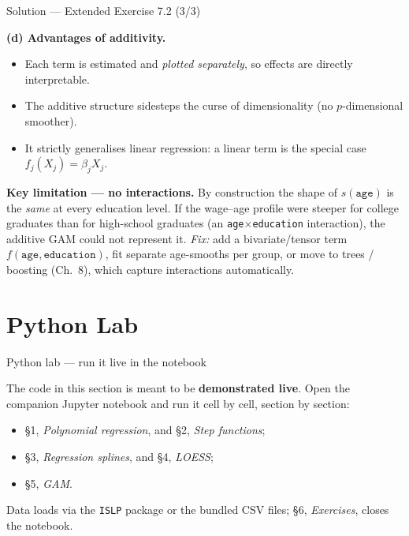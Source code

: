 \documentclass[aspectratio=169,11pt]{beamer}
\begin{document}
\begin{frame}{Solution --- Extended Exercise 7.2 (3/3)}
\begin{solutionbox}
\textbf{(d) Advantages of additivity.}
\begin{itemize}
  \item Each term is estimated and \emph{plotted separately}, so effects are directly interpretable.
  \item The additive structure sidesteps the curse of dimensionality (no $p$-dimensional smoother).
  \item It strictly generalises linear regression: a linear term is the special case $f_j(X_j)=\beta_j X_j$.
\end{itemize}

\textbf{Key limitation --- no interactions.} By construction the shape of $s(\texttt{age})$ is the \emph{same} at every education level. If the wage--age profile were steeper for college graduates than for high-school graduates (an \texttt{age}$\times$\texttt{education} interaction), the additive GAM could not represent it. \emph{Fix:} add a bivariate/tensor term $f(\texttt{age},\texttt{education})$, fit separate age-smooths per group, or move to trees / boosting (Ch.~8), which capture interactions automatically.
\end{solutionbox}
\end{frame}


\section{Python Lab}

\begin{frame}{Python lab --- run it live in the notebook}
  \begin{labnote}
    The code in this section is meant to be \textbf{demonstrated live}. Open the companion Jupyter notebook and run it cell by cell, section by section:
    \begin{itemize}
      \item \S1, \emph{Polynomial regression}, and \S2, \emph{Step functions};
      \item \S3, \emph{Regression splines}, and \S4, \emph{LOESS};
      \item \S5, \emph{GAM}.
    \end{itemize}
    Data loads via the \texttt{ISLP} package or the bundled CSV files; \S6, \emph{Exercises}, closes the notebook.
  \end{labnote}
\end{frame}
\end{document}
